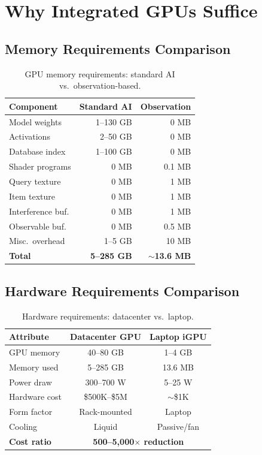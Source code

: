 \documentclass[11pt,twocolumn,a4paper]{article}
\theoremstyle{definition}
\theoremstyle{remark}
\begin{document}
\section{Why Integrated GPUs Suffice}
\label{sec:integrated_gpu}

\subsection{Memory Requirements Comparison}

\begin{table}[H]
\centering
\caption{GPU memory requirements: standard AI vs.\ observation-based.}
\label{tab:memory}
\begin{tabular}{@{}lrr@{}}
\toprule
\textbf{Component} & \textbf{Standard AI} & \textbf{Observation} \\
\midrule
Model weights & 1--130 GB & 0 MB \\
Activations & 2--50 GB & 0 MB \\
Database index & 1--100 GB & 0 MB \\
Shader programs & 0 MB & 0.1 MB \\
Query texture & 0 MB & 1 MB \\
Item texture & 0 MB & 1 MB \\
Interference buf. & 0 MB & 1 MB \\
Observable buf. & 0 MB & 0.5 MB \\
Misc.\ overhead & 1--5 GB & 10 MB \\
\midrule
\textbf{Total} & \textbf{5--285 GB} & \textbf{$\sim$13.6 MB} \\
\bottomrule
\end{tabular}
\end{table}

\subsection{Hardware Requirements Comparison}

\begin{table}[H]
\centering
\caption{Hardware requirements: datacenter vs.\ laptop.}
\label{tab:hardware}
\begin{tabular}{@{}lcc@{}}
\toprule
\textbf{Attribute} & \textbf{Datacenter GPU} & \textbf{Laptop iGPU} \\
\midrule
GPU memory & 40--80 GB & 1--4 GB \\
Memory used & 5--285 GB & 13.6 MB \\
Power draw & 300--700 W & 5--25 W \\
Hardware cost & \$500K--\$5M & $\sim$\$1K \\
Form factor & Rack-mounted & Laptop \\
Cooling & Liquid & Passive/fan \\
\midrule
\textbf{Cost ratio} & \multicolumn{2}{c}{\textbf{500--5{,}000$\times$ reduction}} \\
\bottomrule
\end{tabular}
\end{table}
\end{document}

